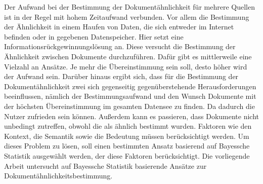 





Der Aufwand bei der Bestimmung der Dokumentähnlichkeit für mehrere Quellen ist in der Regel mit hohem Zeitaufwand verbunden. Vor allem die Bestimmung der Ähnlichkeit in einem Haufen von Daten, die sich entweder im Internet befinden oder in gegebenen Datenspeicher. Hier setzt eine Informationsrückgewinnungslösung an. Diese versucht die Bestimmung der Ähnlichkeit zwischen Dokumente durchzuführen. Dafür gibt es mittlerweile eine Vielzahl an Ansätze. Je mehr die Übereinstimmung sein soll, desto höher wird der Aufwand sein. Darüber hinaus ergibt sich, dass für die Bestimmung der Dokumentähnlichkeit zwei sich gegenseitig gegenüberstehende Herausforderungen beeinflussen, nämlich der Bestimmungsaufwand und den Wunsch Dokumente mit der höchsten Übereinstimmung im gesamten Datensee zu finden.  Da dadurch die Nutzer zufrieden sein können. Außerdem kann es passieren, dass Dokumente nicht unbedingt zutreffen, obwohl die als ähnlich bestimmt wurden. Faktoren wie den Kontext, die Semantik sowie die Bedeutung müssen berücksichtigt werden. Um dieses Problem zu lösen, soll einen bestimmten Ansatz basierend auf Bayessche Statistik ausgewählt werden, der diese Faktoren berücksichtigt.  Die vorliegende Arbeit untersucht auf Bayessche Statistik basierende Ansätze zur Dokumentähnlichkeitsbestimmung.
